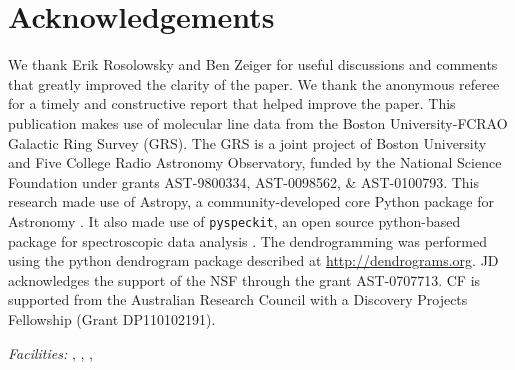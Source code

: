 \section{Acknowledgements}
We thank Erik Rosolowsky and Ben Zeiger for useful discussions and comments
that greatly improved the clarity of the paper.  We thank the anonymous referee
for a timely and constructive report that helped improve the paper.
This publication makes use of molecular line data from the Boston
University-FCRAO Galactic Ring Survey (GRS). The GRS is a joint project of
Boston University and Five College Radio Astronomy Observatory, funded by the
National Science Foundation under grants AST-9800334, AST-0098562, \&
AST-0100793.
This research made use of Astropy, a community-developed core Python package
for Astronomy \citep[\url{http://astropy.org}; ][]{Astropy2013a}.  It also made use of \texttt{pyspeckit}, an
open source python-based package for spectroscopic data analysis
\citep[\url{http://pyspeckit.readthedocs.org}; ][]{Ginsburg2011c}.
The dendrogramming was performed using the python dendrogram package described at
\url{http://dendrograms.org}.
JD acknowledges the support of the NSF through the grant AST-0707713.
CF is supported from the Australian Research Council with a Discovery Projects Fellowship (Grant DP110102191).



{\it Facilities:} , ,
, 



% 
% 

